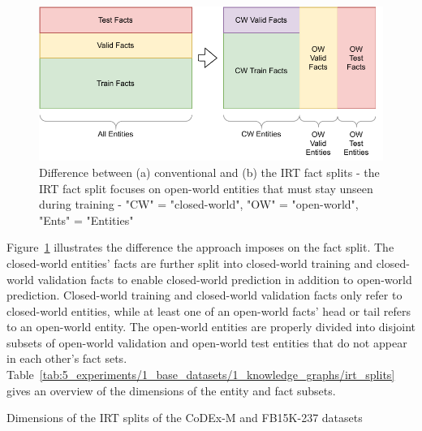 \begin{figure}
    \centering
    \includegraphics[width=\textwidth]{5_experiments/1_base_datasets/1_knowledge_graphs/irt_split}
    \caption{Difference between (a) conventional and (b) the IRT fact splits - the IRT fact split focuses on open-world entities that must stay unseen during training - "CW" = "closed-world", "OW" = "open-world", "Ents" = "Entities"}
    \label{fig:5_experiments/1_base_datasets/1_knowledge_graphs/irt_split}
\end{figure}

Figure~\ref{fig:5_experiments/1_base_datasets/1_knowledge_graphs/irt_split} illustrates the difference the approach imposes on the fact split. The closed-world entities' facts are further split into closed-world training and closed-world validation facts to enable closed-world prediction in addition to open-world prediction. Closed-world training and closed-world validation facts only refer to closed-world entities, while at least one of an open-world facts' head or tail refers to an open-world entity. The open-world entities are properly divided into disjoint subsets of open-world validation and open-world test entities that do not appear in each other's fact sets. Table~\ref{tab:5_experiments/1_base_datasets/1_knowledge_graphs/irt_splits} gives an overview of the dimensions of the entity and fact subsets.

\begin{table}[h]
    \centering
    
    \caption{Dimensions of the IRT splits of the CoDEx-M and FB15K-237 datasets}
    \label{tab:5_experiments/1_base_datasets/1_knowledge_graphs/irt_splits}
\end{table}
